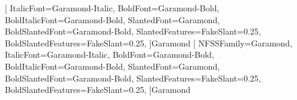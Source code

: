 
\setmainfont[%
  NFSSFamily=Garamond,%
  ItalicFont=Garamond-Italic,%
  BoldFont=Garamond-Bold,%
  BoldItalicFont=Garamond-Bold,%
  SlantedFont=Garamond,%
  BoldSlantedFont=Garamond-Bold,%
  SlantedFeatures={FakeSlant=0.25},%
  BoldSlantedFeatures={FakeSlant=0.25},%
]{Garamond}
\newfontfamily{\greekfont}[%
  ItalicFont=Garamond-Italic,%
  BoldFont=Garamond-Bold,%
  BoldItalicFont=Garamond-Bold,%
  SlantedFont=Garamond,%
  BoldSlantedFont=Garamond-Bold,%
  SlantedFeatures={FakeSlant=0.25},%
  BoldSlantedFeatures={FakeSlant=0.25},%
]{Garamond}
[%
  NFSSFamily=Garamond,%
  ItalicFont=Garamond-Italic,%
  BoldFont=Garamond-Bold,%
  BoldItalicFont=Garamond-Bold,%
  SlantedFont=Garamond,%
  BoldSlantedFont=Garamond-Bold,%
  SlantedFeatures={FakeSlant=0.25},%
  BoldSlantedFeatures={FakeSlant=0.25},%
]{Garamond}





\endinput
